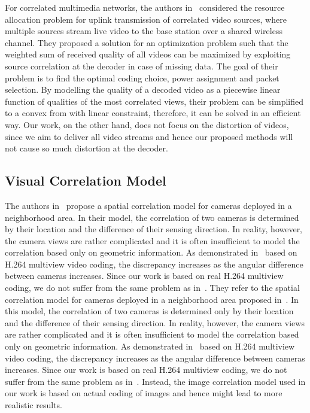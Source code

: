 For correlated multimedia networks, the authors in~\cite{AdaptiveCrossLayerRA} considered the resource allocation problem for uplink transmission of correlated video sources, where multiple sources stream live video to the base station over a shared wireless channel.
They proposed a solution for an optimization problem such that the weighted sum of
received quality of all videos can be maximized by exploiting source correlation at the decoder in case of missing data.
The goal of their problem is to find the optimal coding choice, power assignment and packet selection.
By modelling the quality of a decoded video as a piecewise linear function of qualities of the most correlated views, their problem can be simplified to a convex from with linear constraint, therefore, it can be solved in an efficient way.
Our work, on the other hand, does not focus on the distortion of videos, since we aim to deliver all video streams and hence our proposed methods will not cause so much distortion at the decoder.
%
\subsection{Visual Correlation Model}
The authors in~\cite{SpatialCorrelationModel} propose a spatial correlation model for cameras deployed in a neighborhood area.
In their model, the correlation of two cameras is determined by their location and the difference of their sensing direction.
In reality, however, the camera views are rather complicated and it is often insufficient to model the correlation based only on geometric information.
As demonstrated in~\cite{RealisticModel} based on H.264 multiview video coding, the discrepancy increases as the angular difference between cameras increases.
Since our work is based on real H.264 multiview coding, we do not suffer from the same problem as in~\cite{SpatialCorrelationModel}.
%
They refer to the spatial correlation model for cameras deployed in a neighborhood area proposed in~\cite{SpatialCorrelationModel}.
In this model, the correlation of two cameras is determined only by their location and the difference of their sensing direction.
In reality, however, the camera views are rather complicated and it is often insufficient to model the correlation based only on geometric information.
As demonstrated in~\cite{RealisticModel} based on H.264 multiview video coding, the discrepancy increases as the angular difference between cameras increases.
Since our work is based on real H.264 multiview coding, we do not suffer from the same problem as in~\cite{DMCPclustering,imageModelCluster}.
Instead, the image correlation model used in our work is based on actual coding of images and hence might lead to more realistic results.
%
